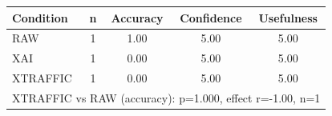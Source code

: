 \begin{tabular}{lcccc}
\toprule
Condition & n & Accuracy & Confidence & Usefulness \\
\midrule
RAW & 1 & 1.00 & 5.00 & 5.00 \\
XAI & 1 & 0.00 & 5.00 & 5.00 \\
XTRAFFIC & 1 & 0.00 & 5.00 & 5.00 \\
\midrule
\multicolumn{5}{l}{\footnotesize XTRAFFIC vs RAW (accuracy): p=1.000, effect r=-1.00, n=1} \\
\bottomrule
\end{tabular}
